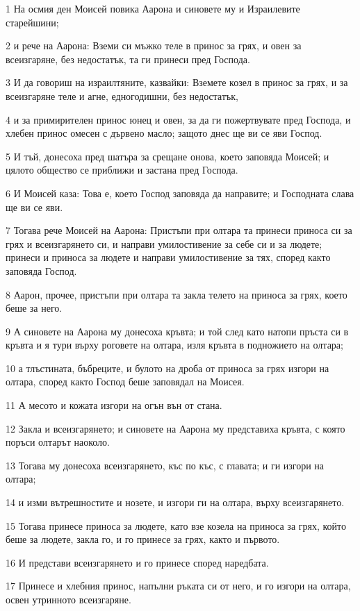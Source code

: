 \par 1 На осмия ден Моисей повика Аарона и синовете му и Израилевите старейшини;
\par 2 и рече на Аарона: Вземи си мъжко теле в принос за грях, и овен за всеизгаряне, без недостатък, та ги принеси пред Господа.
\par 3 И да говориш на израилтяните, казвайки: Вземете козел в принос за грях, и за всеизгаряне теле и агне, едногодишни, без недостатък,
\par 4 и за примирителен принос юнец и овен, за да ги пожертвувате пред Господа, и хлебен принос омесен с дървено масло; защото днес ще ви се яви Господ.
\par 5 И тъй, донесоха пред шатъра за срещане онова, което заповяда Моисей; и цялото общество се приближи и застана пред Господа.
\par 6 И Моисей каза: Това е, което Господ заповяда да направите; и Господната слава ще ви се яви.
\par 7 Тогава рече Моисей на Аарона: Пристъпи при олтара та принеси приноса си за грях и всеизгарянето си, и направи умилостивение за себе си и за людете; принеси и приноса за людете и направи умилостивение за тях, според както заповяда Господ.
\par 8 Аарон, прочее, пристъпи при олтара та закла телето на приноса за грях, което беше за него.
\par 9 А синовете на Аарона му донесоха кръвта; и той след като натопи пръста си в кръвта и я тури върху роговете на олтара, изля кръвта в подножието на олтара;
\par 10 а тлъстината, бъбреците, и булото на дроба от приноса за грях изгори на олтара, според както Господ беше заповядал на Моисея.
\par 11 А месото и кожата изгори на огън вън от стана.
\par 12 Закла и всеизгарянето; и синовете на Аарона му представиха кръвта, с която поръси олтарът наоколо.
\par 13 Тогава му донесоха всеизгарянето, къс по къс, с главата; и ги изгори на олтара;
\par 14 и изми вътрешностите и нозете, и изгори ги на олтара, върху всеизгарянето.
\par 15 Тогава принесе приноса за людете, като взе козела на приноса за грях, който беше за людете, закла го, и го принесе за грях, както и първото.
\par 16 И представи всеизгарянето и го принесе според наредбата.
\par 17 Принесе и хлебния принос, напълни ръката си от него, и го изгори на олтара, освен утринното всеизгаряне.
